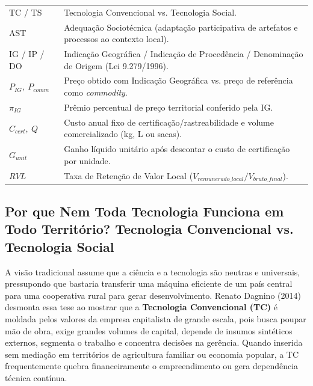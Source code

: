 
\begin{boxSimbolo}
\renewcommand{\arraystretch}{1.18}
\begin{tabular}{@{}p{2.4cm} p{12.0cm}@{}}
  TC / TS & Tecnologia Convencional vs. Tecnologia Social. \\
  AST & Adequação Sociotécnica (adaptação participativa de artefatos e processos ao contexto local). \\
  IG / IP / DO & Indicação Geográfica / Indicação de Procedência / Denominação de Origem (Lei 9.279/1996). \\
  $P_{IG},\ P_{comm}$ & Preço obtido com Indicação Geográfica vs. preço de referência como \textit{commodity}. \\
  $\pi_{IG}$ & Prêmio percentual de preço territorial conferido pela IG. \\
  $C_{cert},\ Q$ & Custo anual fixo de certificação/rastreabilidade e volume comercializado (kg, L ou sacas). \\
  $G_{unit}$ & Ganho líquido unitário após descontar o custo de certificação por unidade. \\
  $RVL$ & Taxa de Retenção de Valor Local ($V_{remunerado\_local} / V_{bruto\_final}$). \\
\end{tabular}
\end{boxSimbolo}

\subsection{Por que Nem Toda Tecnologia Funciona em Todo Território? Tecnologia Convencional vs. Tecnologia Social}

A visão tradicional assume que a ciência e a tecnologia são neutras e universais, pressupondo que bastaria transferir uma máquina eficiente de um país central para uma cooperativa rural para gerar desenvolvimento. Renato Dagnino (2014) desmonta essa tese ao mostrar que a \textbf{Tecnologia Convencional (TC)} é moldada pelos valores da empresa capitalista de grande escala, pois busca poupar mão de obra, exige grandes volumes de capital, depende de insumos sintéticos externos, segmenta o trabalho e concentra decisões na gerência. Quando inserida sem mediação em territórios de agricultura familiar ou economia popular, a TC frequentemente quebra financeiramente o empreendimento ou gera dependência técnica contínua.

